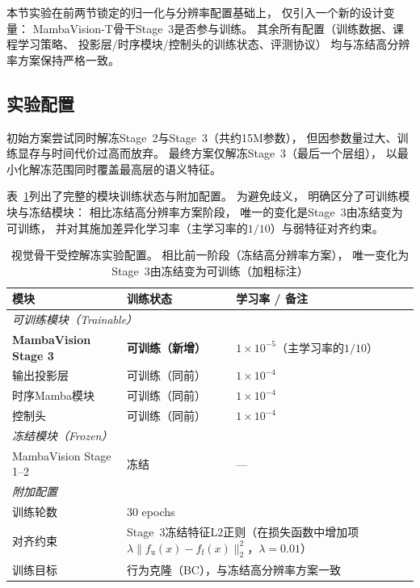 本节实验在前两节锁定的归一化与分辨率配置基础上，
仅引入一个新的设计变量：
MambaVision-T骨干Stage~3是否参与训练。
其余所有配置（训练数据、课程学习策略、
投影层/时序模块/控制头的训练状态、评测协议）
均与冻结高分辨率方案保持严格一致。

\subsection{实验配置}

初始方案尝试同时解冻Stage~2与Stage~3（共约15M参数），
但因参数量过大、训练显存与时间代价过高而放弃。
最终方案仅解冻Stage~3（最后一个层组），
以最小化解冻范围同时覆盖最高层的语义特征。

表~\ref{tab:ch5_unfreeze_config}列出了完整的模块训练状态与附加配置。
为避免歧义，
明确区分了可训练模块与冻结模块：
相比冻结高分辨率方案阶段，
唯一的变化是Stage~3由冻结变为可训练，
并对其施加差异化学习率（主学习率的$1/10$）与弱特征对齐约束。

\begin{table}[!htbp]
\centering
\caption{视觉骨干受控解冻实验配置。
相比前一阶段（冻结高分辨率方案），
唯一变化为Stage~3由冻结变为可训练（加粗标注）}
\label{tab:ch5_unfreeze_config}
\begin{tabular}{p{}p{}p{}}
\toprule
\textbf{模块} & \textbf{训练状态} & \textbf{学习率 / 备注} \\
\midrule
\multicolumn{3}{l}{\textit{可训练模块（Trainable）}} \\
\quad \textbf{MambaVision Stage 3} & \textbf{可训练（新增）} & $1\times10^{-5}$（主学习率的$1/10$） \\
\quad 输出投影层              & 可训练（同前） & $1\times10^{-4}$ \\
\quad 时序Mamba模块           & 可训练（同前） & $1\times10^{-4}$ \\
\quad 控制头                  & 可训练（同前） & $1\times10^{-4}$ \\
\midrule
\multicolumn{3}{l}{\textit{冻结模块（Frozen）}} \\
\quad MambaVision Stage 1--2  & 冻结 & --- \\
\midrule
\multicolumn{3}{l}{\textit{附加配置}} \\
\quad 训练轮数   & \multicolumn{2}{p{0.62\textwidth}}{30 epochs} \\
\quad 对齐约束   & \multicolumn{2}{p{0.62\textwidth}}{Stage~3冻结特征L2正则（在损失函数中增加项 $\lambda\|f_{\mathrm{u}}(x)-f_{\mathrm{f}}(x)\|_2^2$，$\lambda=0.01$）} \\
\quad 训练目标   & \multicolumn{2}{p{0.62\textwidth}}{行为克隆（BC），与冻结高分辨率方案一致} \\
\bottomrule
\end{tabular}
\end{table}
\FloatBarrier


